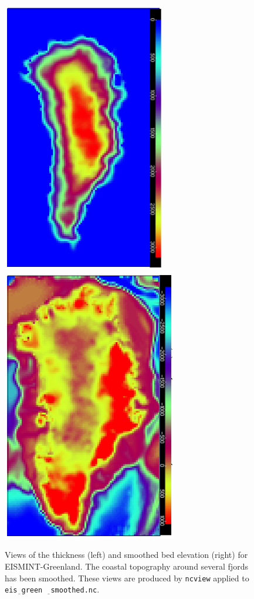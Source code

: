 \documentclass[11pt,final]{amsart}
\newcommand{\und}{$\underline{\,\,\,}$}
\begin{document}
\begin{figure}[ht]
\includegraphics[width=2.8in,keepaspectratio=true]{figs/EISgreen_thick}\qquad\includegraphics[width=3.0in,keepaspectratio=true]{figs/EISgreen_bed}
\caption{Views of the thickness (left) and smoothed bed elevation (right) for EISMINT-Greenland.  The coastal topography around several fjords has been smoothed.  These views are produced by \texttt{ncview} applied to \texttt{eis\und green \und smoothed.nc}.}
\label{fig:greendata}
\end{figure}
\end{document}
